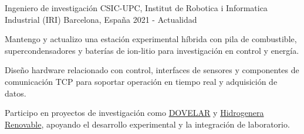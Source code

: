 \cventry
  {Ingeniero de investigaci\'on}
  {CSIC-UPC, Institut de Robotica i Informatica Industrial (IRI)}
  {Barcelona, Espa\~na}
  {2021 - Actualidad}
  {
    \begin{cvitems}
      \item {Mantengo y actualizo una estaci\'on experimental h\'ibrida con pila de combustible, supercondensadores y bater\'ias de ion-litio para investigaci\'on en control y energ\'ia.}
      \item {Dise\~no hardware relacionado con control, interfaces de sensores y componentes de comunicaci\'on TCP para soportar operaci\'on en tiempo real y adquisici\'on de datos.}
      \item {Participo en proyectos de investigaci\'on como \href{https://www.iri.upc.edu/project/show/225}{DOVELAR} y \href{https://pti-transener.csic.es/hidrogenera-renovable-60-kg-h2-dia/}{Hidrogenera Renovable}, apoyando el desarrollo experimental y la integraci\'on de laboratorio.}
    \end{cvitems}
  }
